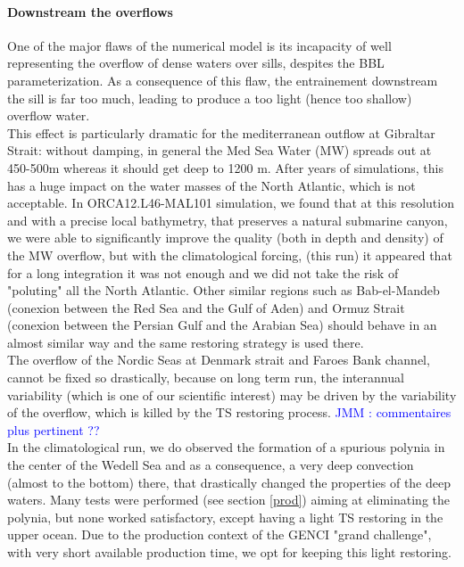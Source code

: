 \paragraph{Downstream the overflows \\}
One of the major flaws of the numerical model is its incapacity of well representing the overflow of dense waters over sills, despites the BBL parameterization.
As a consequence of this flaw, the entrainement downstream the sill is far too much, leading to produce a too light (hence too shallow)  overflow water. \\

This effect is particularly dramatic for the mediterranean outflow at Gibraltar Strait: without damping, in general the Med Sea Water (MW) spreads out at 450-500m 
whereas it should get deep to 1200 m. After years of simulations, this has a huge impact on the water masses of the North Atlantic, which is 
not acceptable. In ORCA12.L46-MAL101 simulation, we found that at this resolution and with a precise local bathymetry, that preserves a natural submarine canyon,
we were able to significantly improve the quality (both in depth and density) of the MW overflow, but with the climatological forcing, (this run) it appeared 
that for a long integration it was not enough and we did not take the risk of "poluting" all the North Atlantic. Other similar regions such as Bab-el-Mandeb 
(conexion between the Red Sea and the Gulf of Aden) and Ormuz Strait (conexion between the Persian Gulf and the Arabian Sea) should behave in an almost similar
way and the same restoring strategy is used there. \\

The overflow of the Nordic Seas at Denmark strait and Faroes Bank channel, cannot be fixed so drastically, because on long term run, the interannual variability
(which is one of our scientific interest) may be driven by the variability of the overflow, which is killed by the TS restoring process.
\textcolor{blue}{ JMM : commentaires plus pertinent ??}\\

In the climatological run, we do observed the formation of a spurious polynia in the center of the Wedell Sea and as a consequence, a very deep convection (almost to the bottom) there, that drastically changed the properties of the deep waters. Many tests were performed (see section \ref{prod}) aiming at eliminating the polynia, but none worked satisfactory, except having a light TS restoring in the upper ocean. Due to the production context of the GENCI "grand challenge", with very
short available production time, we opt for keeping this light restoring.

